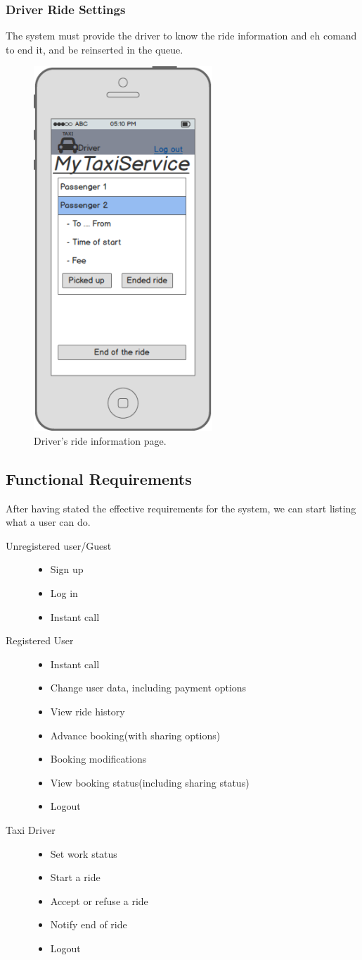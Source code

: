 		\subsubsection {Driver Ride Settings}
			The system must provide the driver to know the ride information and eh comand to end it, and be reinserted \askpippo in the queue.
		 	\begin{figure}[h!]
				\includegraphics[width=0.6\textwidth, width=3cm]{mockup/appdriveron}
				\caption{Driver's ride information page.}
			\end{figure}
			\newpage
\subsection{Functional Requirements}
	After having stated the effective requirements for the system, we can start listing what a user can do.
		\begin{description}
		\item[Unregistered user/Guest] \hfill
			\begin{itemize}
				\item Sign up
				\item Log in
				\item Instant call
			\end{itemize}
		\item[Registered User] \hfill
			\begin{itemize}
				\item Instant call
				\item Change user data, including payment options
				\item View ride history
				\item Advance booking(with sharing options)
				\item Booking modifications
				\item View booking status(including sharing status)
				\item Logout
			\end{itemize}
		\item[Taxi Driver] \hfill
			\begin{itemize}
				\item Set work status
				\item Start a ride
				\item Accept or refuse a ride
				\item Notify end of ride
				\item Logout
			\end{itemize}
		\end{description}
\newpage
